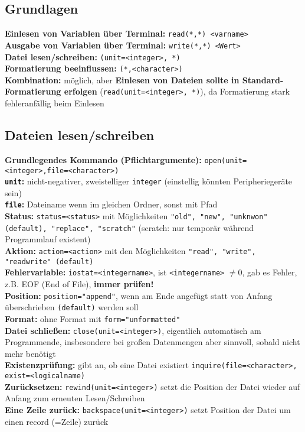 \documentclass[a4paper, twocolumn]{scrarticle}
\begin{document}
\subsection{Grundlagen}
\textbf{Einlesen von Variablen über Terminal:} \lstinline|read(*,*) <varname>|\\
\textbf{Ausgabe von Variablen über Terminal:} \lstinline|write(*,*) <Wert>|\\
\textbf{Datei lesen/schreiben:} \lstinline|(unit=<integer>, *)|\\
\textbf{Formatierung beeinflussen:} \lstinline|(*,<character>)|\\
\textbf{Kombination:} möglich, aber \textbf{Einlesen von Dateien sollte in Standard-Formatierung erfolgen} (\lstinline|read(unit=<integer>, *)|), da Formatierung stark fehleranfällig beim Einlesen

\subsection{Dateien lesen/schreiben}
\textbf{Grundlegendes Kommando (Pflichtargumente):} \lstinline|open(unit=<integer>,file=<character>)|\\
\textbf{\lstinline|unit|:} nicht-negativer, zweistelliger \lstinline|integer| (einstellig könnten Peripheriegeräte sein)\\
\textbf{\lstinline|file|:} Dateiname wenn im gleichen Ordner, sonst mit Pfad\\
\textbf{Status:} \lstinline|status=<status>| mit Möglichkeiten \lstinline|"old", "new", "unknwon" (default), "replace", "scratch"| (scratch: nur temporär während Programmlauf existent)\\
\textbf{Aktion:} \lstinline|action=<action>| mit den Möglichkeiten \lstinline|"read", "write", "readwrite" (default)|\\
\textbf{Fehlervariable:} \lstinline|iostat=<integername>|, ist \lstinline|<integername>| $\neq 0$, gab es Fehler, z.B. EOF (End of File), \textbf{immer prüfen!}\\
\textbf{Position:} \lstinline|position="append"|, wenn am Ende angefügt statt von Anfang überschrieben \lstinline|(default)| werden soll\\
\textbf{Format:} ohne Format mit \lstinline|form="unformatted"|\\
\textbf{Datei schließen:} \lstinline|close(unit=<integer>)|, eigentlich automatisch am Programmende, insbesondere bei großen Datenmengen aber sinnvoll, sobald nicht mehr benötigt\\
\textbf{Existenzprüfung:} gibt an, ob eine Datei existiert \lstinline|inquire(file=<character>, exist=<logicalname)| \\
\textbf{Zurücksetzen:} \lstinline|rewind(unit=<integer>)| setzt die Position der Datei wieder auf Anfang zum erneuten Lesen/Schreiben\\
\textbf{Eine Zeile zurück:} \lstinline|backspace(unit=<integer>)| setzt Position der Datei um einen record (=Zeile) zurück
\end{document}
